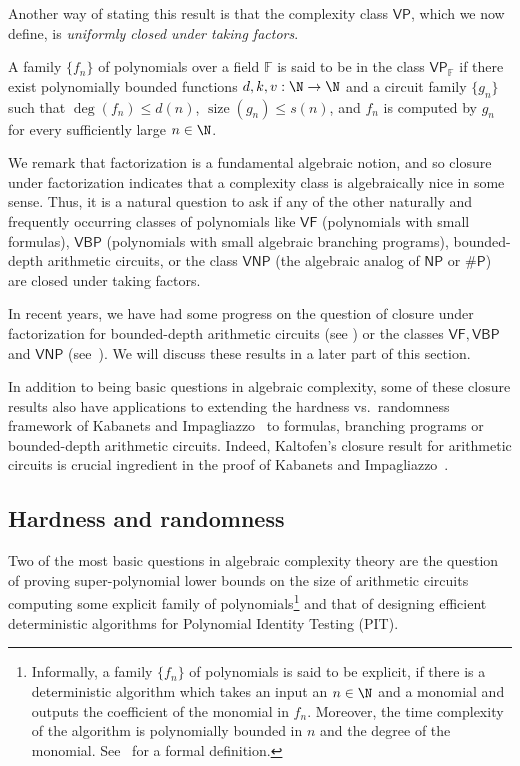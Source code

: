 \documentclass{toc}
\newcommand{\ComplexityFont}[1]{{\ensuremath{\mathsf{#1}}}}
\newcommand{\class}[1]{\ComplexityFont{#1}}
\newcommand{\VNP}{\ComplexityFont{VNP}}
\newcommand{\VP}{\ComplexityFont{VP}}
\newcommand{\NP}{\ComplexityFont{NP}}
\newcommand{\F}{\mathbb{F}}
\DeclareMathOperator{\size}{size}
\begin{document}
Another way of stating this result is that the complexity class $\VP$, which we now define, is \emph{uniformly closed under taking factors}.
\begin{definition}[$\VP$]\label{def:VP}
%
A family $\{f_n\}$ of polynomials   %
over a field $\F$ is said to be in the class $\VP_{\F}$ if there exist polynomially bounded functions $d, k, v : \N\rightarrow \N$ and a circuit family $\{g_n\}$ such that $\deg(f_n)\leq d(n)$, $\size(g_n)\leq s(n)$, and $f_n$ is computed by $g_n$ for every sufficiently large $n \in \N$.
\end{definition}
We remark that factorization is a fundamental algebraic notion, and so closure under factorization indicates that a complexity class is algebraically nice in some sense. Thus, it is a natural question to ask if any of the other naturally and frequently occurring classes of polynomials like $\class{VF}$ (polynomials with small formulas), $\class{VBP}$ (polynomials with small algebraic branching programs),
%
bounded-depth   %
arithmetic circuits, or the class $\VNP$ (the algebraic analog of $\NP$ or $\#\class{P}$) are closed under taking factors. 

In recent years, we have had some progress on the question of closure under factorization 
for
%
bounded-depth   %
arithmetic circuits (see \cite{DSY09, O16}) or the classes $\class{VF}, \class{VBP}$ and $\VNP$ (see~\cite{DSS17}). We will discuss these results in a later part of this section.

In addition to being basic questions in algebraic complexity, some of these closure results also have applications to extending the hardness
%
vs.\ randomness framework of Kabanets and Impagliazzo~\cite{ki03} to formulas, branching programs or
%
bounded-depth   %
arithmetic circuits. Indeed, Kaltofen's closure result for arithmetic circuits is crucial ingredient in the proof of Kabanets and Impagliazzo~\cite{ki03}. 

\subsection{Hardness and randomness}  %
%
Two of the most basic questions in algebraic complexity theory are the question of proving super-polynomial lower bounds on the size of arithmetic circuits computing some
%
explicit family of polynomials\footnote{Informally, a family $\{f_n\}$ of polynomials is said to be explicit, if there is a deterministic algorithm which takes an input an $n \in \N$ and a monomial and outputs the coefficient of the monomial in $f_n$. Moreover, the time complexity of the algorithm is polynomially bounded in $n$ and the degree of the monomial. See~ for a formal definition.}   %
%
and that of designing efficient deterministic algorithms for Polynomial Identity Testing (PIT). 
\end{document}
